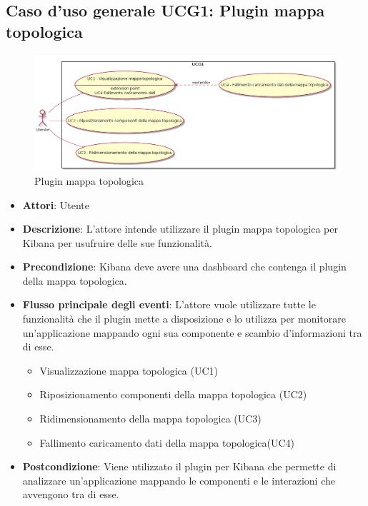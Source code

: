 \subsection{Caso d'uso generale  UCG1: Plugin mappa topologica}
\begin{figure} [H]
	\centering
	\includegraphics[scale=0.40]{./UC/UCG1.png}
	\caption{Plugin mappa topologica}\label{}
\end{figure}
\begin{itemize}
	\item \textbf{Attori}: Utente
	\item \textbf{Descrizione}: L'attore intende utilizzare il plugin mappa topologica per Kibana per usufruire delle sue funzionalità.
	\item \textbf{Precondizione}: Kibana deve avere una dashboard che contenga il plugin della mappa topologica.
	\item \textbf{Flusso principale degli eventi}: 
	L'attore vuole utilizzare tutte le funzionalità che il plugin mette a disposizione e lo utilizza per monitorare un'applicazione mappando ogni sua componente e scambio d'informazioni tra di esse.
	\begin{itemize}
		\item Visualizzazione mappa topologica (UC1)
		\item Riposizionamento componenti della mappa topologica (UC2)
		\item Ridimensionamento della mappa topologica (UC3)
		\item Fallimento caricamento dati della mappa topologica(UC4)
	\end{itemize}
	\item \textbf{Postcondizione}: Viene utilizzato il plugin per Kibana che permette di analizzare un'applicazione mappando le componenti e le interazioni che avvengono tra di esse.
\end{itemize}

 \hypertarget{UCG2}{}
